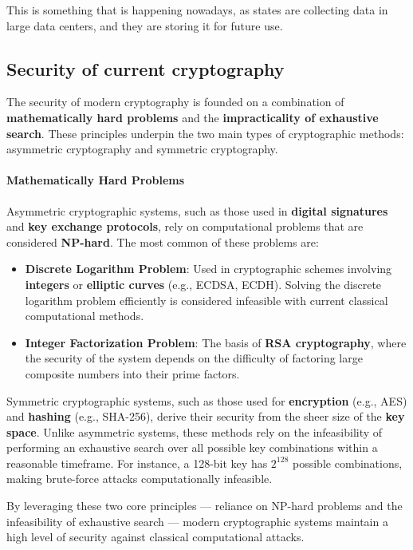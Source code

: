 This is something that is happening nowadays, as states are collecting
data in large data centers, and they are storing it for future use.

\subsection{Security of current cryptography}

The security of modern cryptography is founded on a combination of
\textbf{mathematically hard problems} and the \textbf{impracticality
of exhaustive search}. These principles underpin the two main types of
cryptographic methods: asymmetric cryptography and symmetric
cryptography.

\paragraph{Mathematically Hard Problems}  
Asymmetric cryptographic systems, such as those used in
\textbf{digital signatures} and \textbf{key exchange protocols}, rely
on computational problems that are considered \textbf{NP-hard}. The
most common of these problems are:  
\begin{itemize}
    \item \textbf{Discrete Logarithm Problem}: Used in cryptographic
      schemes involving \textbf{integers} or \textbf{elliptic curves}
      (e.g., ECDSA, ECDH). Solving the discrete logarithm problem
      efficiently is considered infeasible with current classical
      computational methods.  
    \item \textbf{Integer Factorization Problem}: The basis of
      \textbf{RSA cryptography}, where the security of the system
      depends on the difficulty of factoring large composite numbers
      into their prime factors.  
\end{itemize}

Symmetric cryptographic systems, such as those used for
\textbf{encryption} (e.g., AES) and \textbf{hashing} (e.g., SHA-256),
derive their security from the sheer size of the \textbf{key space}.
Unlike asymmetric systems, these methods rely on the infeasibility of
performing an exhaustive search over all possible key combinations
within a reasonable timeframe. For instance, a 128-bit key has
$2^{128}$ possible combinations, making brute-force attacks
computationally infeasible.  

By leveraging these two core principles — reliance on NP-hard problems
and the infeasibility of exhaustive search — modern cryptographic
systems maintain a high level of security against classical
computational attacks.

